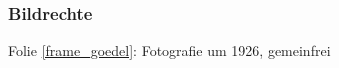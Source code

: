 \documentclass[aspectratio=1610,onlymath]{beamer}
\begin{document}
\begin{frame}[t]\frametitle{Bildrechte}

Folie \ref{frame_goedel}: Fotografie um 1926, gemeinfrei

\end{frame}
\end{document}

